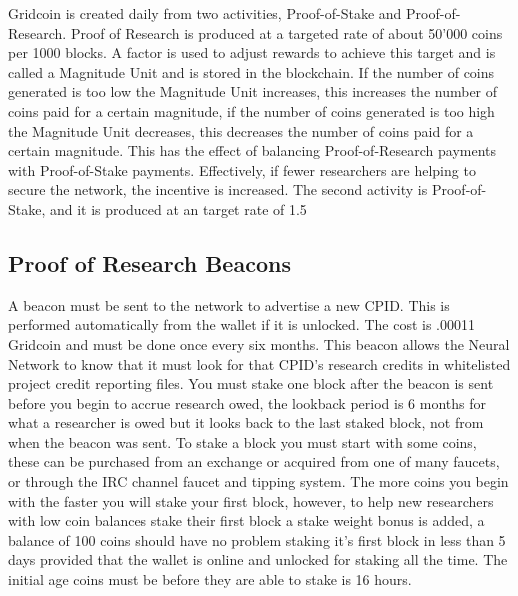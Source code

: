 Gridcoin is created daily from two activities, Proof-of-Stake and Proof-of-Research. Proof of Research is produced at a targeted rate of about 50'000 coins per 1000 blocks. A factor is used to adjust rewards to achieve this target and is called a Magnitude Unit and is stored in the blockchain. If the number of coins generated is too low the Magnitude Unit increases, this increases the number of coins paid for a certain magnitude, if the number of coins generated is too high the Magnitude Unit decreases, this decreases the number of coins paid for a certain magnitude. This has the effect of balancing Proof-of-Research payments with Proof-of-Stake payments. Effectively, if fewer researchers are helping to secure the network, the incentive is increased. The second activity is Proof-of-Stake, and it is produced at an target rate of 1.5%

\subsection{Proof of Research Beacons}

A beacon must be sent to the network to advertise a new CPID. This is performed automatically from the wallet if it is unlocked. The cost is .00011 Gridcoin and must be done once every six months. This beacon allows the Neural Network to know that it must look for that CPID's research credits in whitelisted project credit reporting files. You must stake one block after the beacon is sent before you begin to accrue research owed, the lookback period is 6 months for what a researcher is owed but it looks back to the last staked block, not from when the beacon was sent. To stake a block you must start with some coins, these can be purchased from an exchange or acquired from one of many faucets, or through the IRC channel faucet and tipping system. The more coins you begin with the faster you will stake your first block, however, to help new researchers with low coin balances stake their first block a stake weight bonus is added, a balance of 100 coins should have no problem staking it's first block in less than 5 days provided that the wallet is online and unlocked for staking all the time. The initial age coins must be before they are able to stake is 16 hours.

